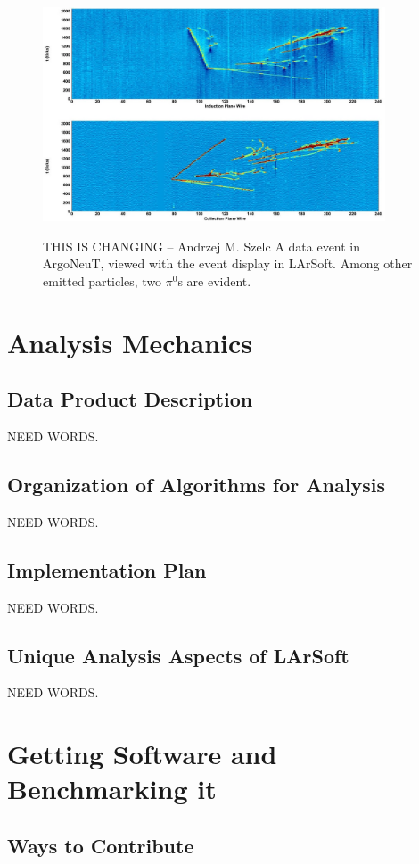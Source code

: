 \documentclass[12pt]{elsarticle}
\begin{document}
\hspace*{2cm}
\begin{figure}[h]
\centering
\caption{THIS IS CHANGING -- Andrzej M. Szelc A data event in ArgoNeuT, viewed with the event display in LArSoft. Among other emitted particles, two $\pi^0$s are evident.}
\includegraphics[width=4.0in]{./imgs/ArgoNeuT_event.jpg}
\label{argo.evd}
\end{figure}

               
\section{Analysis Mechanics}

\subsection{Data Product Description}
NEED WORDS.

\subsection{Organization of Algorithms for Analysis}
NEED WORDS.

\subsection{Implementation Plan}
NEED WORDS.

\subsection{Unique Analysis Aspects of LArSoft}
NEED WORDS.

\section{Getting Software and Benchmarking it}
\subsection{Ways to Contribute}
\end{document}
